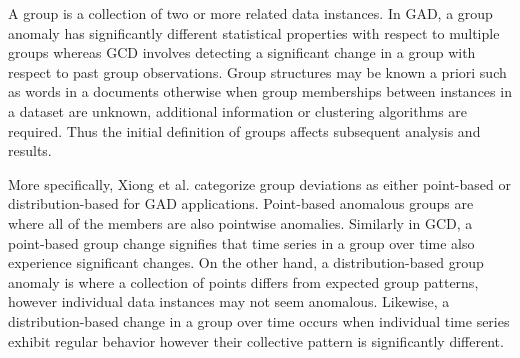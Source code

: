 




  


 
 





A group is a collection of two or more related data instances.    %
In GAD, a group anomaly has  significantly different  statistical properties  with respect to multiple groups whereas GCD involves detecting  a significant change   in a group  with respect to past group observations.   Group structures may be known a priori such as words in a documents otherwise when group   memberships between instances in a dataset are unknown, additional information or clustering algorithms are required. 
  Thus the initial definition of groups affects subsequent analysis and results. 



 
    
   
More specifically,  Xiong et al.  \cite{MGM} categorize group deviations as either point-based or distribution-based for GAD applications.   Point-based anomalous groups are where all of the members are also pointwise anomalies. Similarly in GCD, a point-based group change signifies that time series in a group over time also experience significant changes.   On the other hand, a  distribution-based group anomaly  is where a collection of points differs from expected group patterns, however individual data instances may not seem anomalous. Likewise, a distribution-based change in a group over time occurs when individual time series exhibit regular behavior however their collective pattern is significantly different.   

